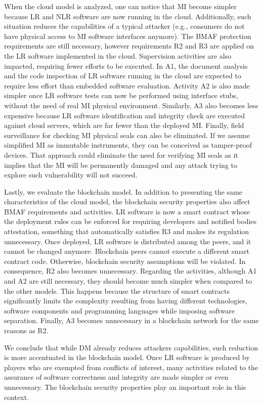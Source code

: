 \documentclass[journal]{IEEEtran}
\begin{document}
When the cloud model is analyzed, one can notice that MI become simpler because LR and NLR software are now running in the cloud.
Additionally, such situation reduces the capabilities of a typical attacker (e.g., consumers do not have physical access to MI software interfaces anymore).
The BMAF protection requirements are still necessary, however requirements R2 and R3 are applied on the LR software implemented in the cloud. 
Supervision activities are also impacted, requiring fewer efforts to be executed.
In A1, the document analysis and the code inspection of LR software running in the cloud are expected to require less effort than embedded software evaluation. 
Activity A2 is also made simpler once LR software tests can now be performed using interface stubs, without the need of real MI physical environment. 
Similarly, A3 also becomes less expensive because LR software identification and integrity check are executed against cloud servers, which are far fewer than the deployed MI. 
Finally, field surveillance for checking MI physical seals can also be eliminated. 
If we assume simplified MI as immutable instruments, they can be conceived as tamper-proof devices. 
That approach could eliminate the need for verifying MI seals as it implies that the MI will be permanently damaged and any attack trying to explore such vulnerability will not succeed.

Lastly, we evaluate the blockchain model. 
In addition to presenting the same characteristics of the cloud model, the blockchain security properties also affect BMAF requirements and activities. 
LR software is now a smart contract whose the deployment rules can be enforced for requiring developers and notified bodies attestation, something that automatically satisfies R3 and makes its regulation unnecessary.
Once deployed, LR software is distributed among the peers, and it cannot be changed anymore.
Blockchain peers cannot execute a different smart contract code. Otherwise, blockchain security assumptions will be violated.
In consequence, R2 also becomes unnecessary.
Regarding the activities, although A1 and A2 are still necessary, they should become much simpler when compared to the other models.
This happens because the structure of smart contracts significantly limits the complexity resulting from having different technologies, software components and programming languages while imposing software separation.
Finally, A3 becomes unnecessary in a blockchain network for the same reasons as R2.

We conclude that while DM already reduces attackers capabilities, such reduction is more accentuated in the blockchain model. 
Once LR software is produced by players who are exempted from conflicts of interest, many activities related to the assurance of software correctness and integrity are made simpler or even unnecessary. 
The blockchain security properties play an important role in this context. 
\end{document}
